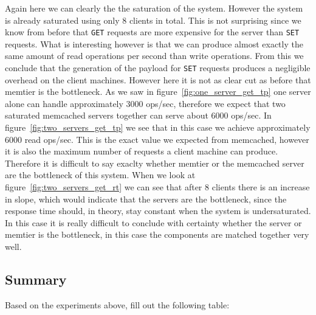 \documentclass[11pt,a4paper]{article}
\begin{document}
%
Again here we can clearly the the saturation of the system.
%
However the system is already saturated using only 8 clients in total.
%
This is not surprising since we know from before that \texttt{GET} requests are more expensive for the server than \texttt{SET} requests.
%
What is interesting however is that we can produce almost exactly the same amount of read operations per second than write operations. 
%
From this we conclude that the generation of the payload for \texttt{SET} requests produces a negligible overhead on the client machines.
%
However here it is not as clear cut as before that memtier is the bottleneck.
%
As we saw in figure~\ref{fig:one_server_get_tp} one server alone can handle approximately 3000 ops/sec, therefore we expect that two saturated memcached servers together can serve about 6000 ops/sec.
%
In figure~\ref{fig:two_servers_get_tp} we see that in this case we achieve approximately 6000 read ops/sec.
%
This is the exact value we expected from memcached, however it is also the maximum number of requests a client machine can produce.
%
Therefore it is difficult to say exaclty whether memtier or the memcached server are the bottleneck of this system.
%
When we look at figure~\ref{fig:two_servers_get_rt} we can see that after 8 clients there is an increase in slope, which would indicate that the servers are the bottleneck, since the response time should, in theory, stay constant when the system is undersaturated.
%
In this case it is really difficult to conclude with certainty whether the server or memtier is the bottleneck, in this case the components are matched together very well.
%
\subsection{Summary}

Based on the experiments above, fill out the following table:
\end{document}
